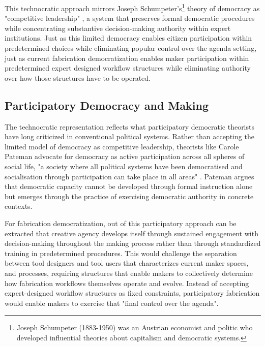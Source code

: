 This technocratic approach mirrors Joseph Schumpeter's\footnote{Joseph Schumpeter (1883-1950) was an Austrian economist and politic who developed influential theories about capitalism and democratic systems.} theory of democracy as "competitive leadership" \citep{schumpeter1950}, a system that preserves formal democratic procedures while concentrating substantive decision-making authority within expert institutions. Just as this limited democracy enables citizen participation within predetermined choices while eliminating popular control over the agenda setting, just as current fabrication democratization enables maker participation within predetermined expert designed workflow structures while eliminating authority over how those structures have to be operated.

\subsection{Participatory Democracy and Making}

The technocratic representation reflects what participatory democratic theorists have long criticized in conventional political systems. Rather than accepting the limited model of democracy as competitive leadership, theorists like Carole Pateman advocate for democracy as active participation across all spheres of social life, "a society where all political systems have been democratised and socialisation through participation can take place in all areas" \citep{pateman1976}. Pateman argues that democratic capacity cannot be developed through formal instruction alone but emerges through the practice of exercising democratic authority in concrete contexts.

\vspace{0.5cm}

For fabrication democratization, out of this participatory approach can be extracted that creative agency develops itself through sustained engagement with decision-making throughout the making process rather than through standardized training in predetermined procedures. This would challenge the separation between tool designers and tool users that characterizes current maker spaces, and processes, requiring structures that enable makers to collectively determine how fabrication workflows themselves operate and evolve. Instead of accepting expert-designed workflow structures as fixed constraints, participatory fabrication would enable makers to exercise that "final control over the agenda".

